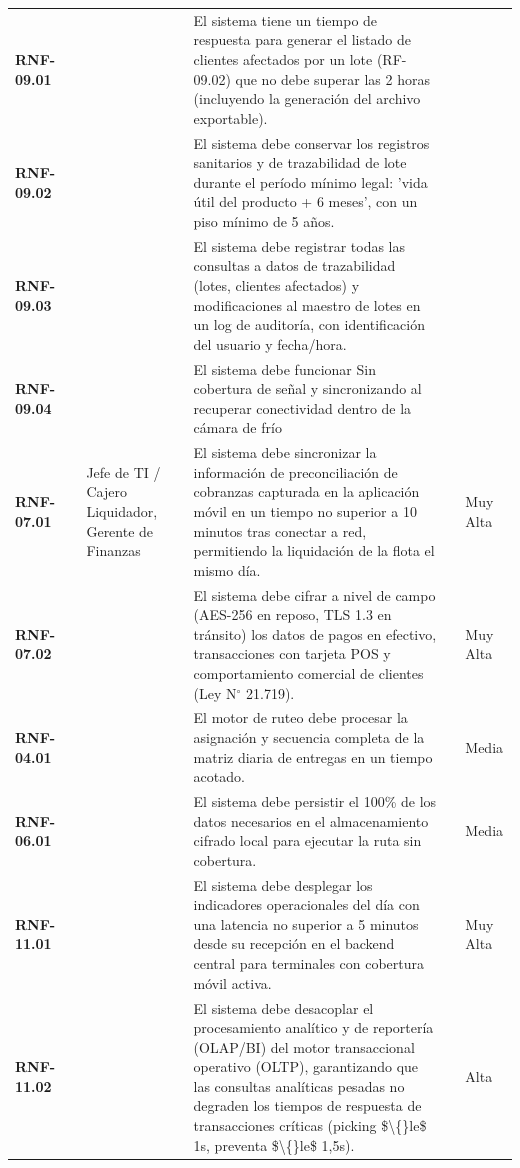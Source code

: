 \begin{longtable}{p{1.8cm} p{2.3cm} p{1.8cm} p{4.8cm} p{2.2cm} p{1.1cm}}
\textbf{RNF-09.01} &  &  & El sistema tiene un tiempo de respuesta para generar el listado de clientes afectados por un lote (RF-09.02) que no debe superar las 2 horas (incluyendo la generación del archivo exportable). &  &  \\
\textbf{RNF-09.02} &  &  & El sistema debe conservar los registros sanitarios y de trazabilidad de lote durante el período mínimo legal: 'vida útil del producto + 6 meses', con un piso mínimo de 5 años. &  &  \\
\textbf{RNF-09.03} &  &  & El sistema debe registrar todas las consultas a datos de trazabilidad (lotes, clientes afectados) y modificaciones al maestro de lotes en un log de auditoría, con identificación del usuario y fecha/hora. &  &  \\
\textbf{RNF-09.04} &  &  & El sistema debe funcionar Sin cobertura de señal y sincronizando al recuperar conectividad dentro de la cámara de frío &  &  \\
\textbf{RNF-07.01} &  & Jefe de TI / Cajero Liquidador, Gerente de Finanzas & El sistema debe sincronizar la información de preconciliación de cobranzas capturada en la aplicación móvil en un tiempo no superior a 10 minutos tras conectar a red, permitiendo la liquidación de la flota el mismo día. &  & Muy Alta \\
\textbf{RNF-07.02} &  &  & El sistema debe cifrar a nivel de campo (AES-256 en reposo, TLS 1.3 en tránsito) los datos de pagos en efectivo, transacciones con tarjeta POS y comportamiento comercial de clientes (Ley N\ensuremath{^\circ} 21.719). &  & Muy Alta \\
\textbf{RNF-04.01} &  &  & El motor de ruteo debe procesar la asignación y secuencia completa de la matriz diaria de entregas en un tiempo acotado. &  & Media \\
\textbf{RNF-06.01} &  &  & El sistema debe persistir el 100\% de los datos necesarios en el almacenamiento cifrado local para ejecutar la ruta sin cobertura. &  & Media \\
\textbf{RNF-11.01} &  &  & El sistema debe desplegar los indicadores operacionales del día con una latencia no superior a 5 minutos desde su recepción en el backend central para terminales con cobertura móvil activa. &  & Muy Alta \\
\textbf{RNF-11.02} &  &  & El sistema debe desacoplar el procesamiento analítico y de reportería (OLAP/BI) del motor transaccional operativo (OLTP), garantizando que las consultas analíticas pesadas no degraden los tiempos de respuesta de transacciones críticas (picking \$\textbackslash\{\}le\$ 1s, preventa \$\textbackslash\{\}le\$ 1,5s). &  & Alta \\
\end{longtable}

